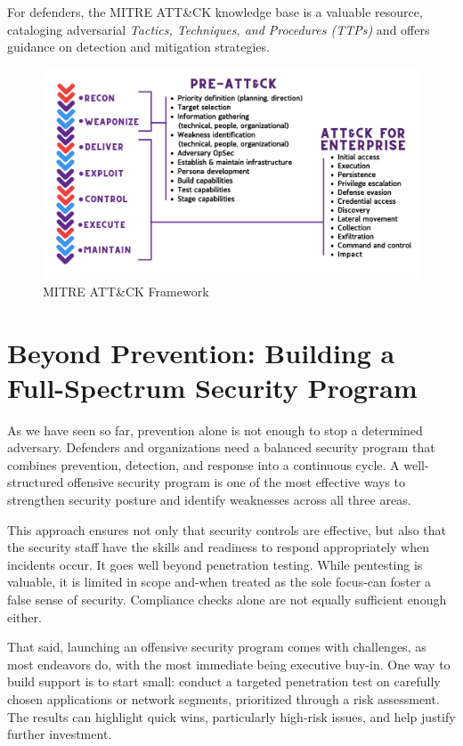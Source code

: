 For defenders, the MITRE ATT\&CK knowledge base is a valuable resource, cataloging adversarial \textit{Tactics, Techniques, and Procedures (TTPs)} and offers guidance on detection and mitigation strategies.
\begin{figure}
    \centering
    \includegraphics[width=0.75\linewidth]{att&ck.png}
    \caption{MITRE ATT\&CK Framework}
    \label{fig:placeholder}
\end{figure}

\section{Beyond Prevention: Building a Full-Spectrum Security Program}
As we have seen so far, prevention alone is not enough to stop a determined adversary. Defenders and organizations need a balanced security program that combines prevention, detection, and response into a continuous cycle. A well-structured offensive security program is one of the most effective ways to strengthen security posture and identify weaknesses across all three areas.

This approach ensures not only that security controls are effective, but also that the security staff have the skills and readiness to respond appropriately when incidents occur. It goes well beyond penetration testing. While pentesting is valuable, it is limited in scope and-when treated as the sole focus-can foster a false sense of security. Compliance checks alone are not equally sufficient enough either.

That said, launching an offensive security program comes with challenges, as most endeavors do, with the most immediate being executive buy-in. One way to build support is to start small: conduct a targeted penetration test on carefully chosen applications or network segments, prioritized through a risk assessment. The results can highlight quick wins, particularly high-risk issues, and help justify further investment.

